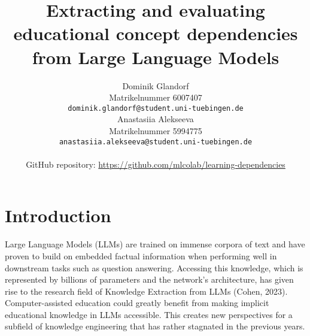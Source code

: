 \documentclass{article}
\title{Extracting and evaluating educational concept dependencies from Large Language Models}
\author{%
  Dominik Glandorf\\
  Matrikelnummer 6007407\\
  \texttt{dominik.glandorf@student.uni-tuebingen.de} \\
  \And
  Anastasiia Alekseeva\\
  Matrikelnummer 5994775\\
  \texttt{anastasiia.alekseeva@student.uni-tuebingen.de} \\
  \\
  GitHub repository: \url{https://github.com/mlcolab/learning-dependencies}
}
\begin{document}
\vspace*{-5mm}
\maketitle
\vspace*{-5mm}

\begin{abstract}





\end{abstract}

\section{Introduction}
Large Language Models (LLMs) are trained on immense corpora of text and have proven to build on embedded factual information when performing well in downstream tasks such as question answering. Accessing this knowledge, which is represented by billions of parameters and the network's architecture, has given rise to the research field of Knowledge Extraction from LLMs (Cohen, 2023). Computer-assisted education could greatly benefit from making implicit educational knowledge in LLMs accessible. This creates new perspectives for a subfield of knowledge engineering that has rather stagnated in the previous years.
\end{document}

